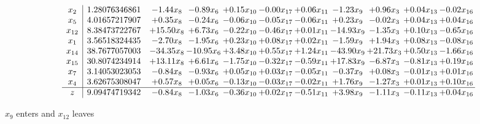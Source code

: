 \documentclass[9pt]{article}
\begin{document}
 \[\begin{array}{c| c c@{\hskip 2pt} c@{\hskip 2pt} c@{\hskip 2pt} c@{\hskip 2pt} c@{\hskip 2pt} c@{\hskip 2pt} c@{\hskip 2pt} c@{\hskip 2pt} c@{\hskip 2pt} }
 x_{2}   &  1.28076346861 & -1.44 x_{8} & -0.89 x_{6} & +  0.15 x_{10} & -0.00 x_{17} & +  0.06 x_{11} & -1.23 x_{9} & +  0.96 x_{3} & +  0.04 x_{13} & -0.02 x_{16}\\
 x_{5}   &  4.01657217907 & +  0.35 x_{8} & -0.24 x_{6} & -0.06 x_{10} & -0.05 x_{17} & -0.06 x_{11} & +  0.23 x_{9} & -0.02 x_{3} & +  0.04 x_{13} & +  0.04 x_{16}\\
 x_{12}   &  8.38473722767 & + 15.50 x_{8} & +  6.73 x_{6} & -0.22 x_{10} & -0.46 x_{17} & +  0.01 x_{11} & -14.93 x_{9} & -1.35 x_{3} & +  0.10 x_{13} & -0.65 x_{16}\\
 x_{1}   &  3.56518324435 & -2.70 x_{8} & -1.95 x_{6} & +  0.23 x_{10} & +  0.08 x_{17} & +  0.02 x_{11} & -1.59 x_{9} & +  1.94 x_{3} & +  0.08 x_{13} & -0.08 x_{16}\\
 x_{14}   &  38.7677057003 & -34.35 x_{8} & -10.95 x_{6} & +  3.48 x_{10} & +  0.55 x_{17} & +  1.24 x_{11} & -43.90 x_{9} & + 21.73 x_{3} & +  0.50 x_{13} & -1.66 x_{16}\\
 x_{15}   &  30.8074234914 & + 13.11 x_{8} & +  6.61 x_{6} & -1.75 x_{10} & -0.32 x_{17} & -0.59 x_{11} & + 17.83 x_{9} & -6.87 x_{3} & -0.81 x_{13} & +  0.19 x_{16}\\
 x_{7}   &  3.14053023053 & -0.84 x_{8} & -0.93 x_{6} & +  0.05 x_{10} & +  0.03 x_{17} & -0.05 x_{11} & -0.37 x_{9} & +  0.08 x_{3} & -0.01 x_{13} & +  0.01 x_{16}\\
 x_{4}   &  3.62675308047 & +  0.57 x_{8} & +  0.05 x_{6} & -0.13 x_{10} & -0.03 x_{17} & -0.02 x_{11} & +  1.76 x_{9} & -1.27 x_{3} & +  0.01 x_{13} & +  0.10 x_{16}\\
\hline
z    &  9.09474719342 & -0.84 x_{8} & -1.03 x_{6} & -0.36 x_{10} & +  0.02 x_{17} & -0.51 x_{11} & +  3.98 x_{9} & -1.11 x_{3} & -0.11 x_{13} & +  0.04 x_{16}\\
\end{array}\]


 $ x_{9} $ enters and $ x_{12} $ leaves 
\end{document}
